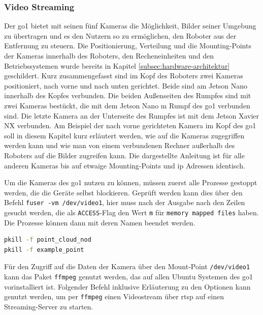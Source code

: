 \subsubsection{Video Streaming}
\label{subsubsec:video-streaming}

Der \gls{go1} bietet mit seinen fünf Kameras die Möglichkeit, Bilder seiner Umgebung zu übertragen und es den Nutzern so
zu ermöglichen, den Roboter aus der Entfernung zu steuern.
Die Positionierung, Verteilung und die Mounting-Points der Kameras innerhalb des Roboters, den Recheneinheiten und den
Betriebssystemen wurde bereits in Kapitel \ref{subsec:hardware-architektur} geschildert.
Kurz zusammengefasst sind im Kopf des Roboters zwei Kameras positioniert, nach vorne und nach unten gerichtet.
Beide sind am Jetson Nano innerhalb des Kopfes verbunden.
Die beiden Außenseiten des Rumpfes sind mit zwei Kameras bestückt, die mit dem Jetson Nano m Rumpf des \gls{go1} verbunden sind.
Die letzte Kamera an der Unterseite des Rumpfes ist mit dem Jetson Xavier NX verbunden.
Am Beispiel der nach vorne gerichteten Kamera im Kopf des \gls{go1} soll in diesem Kapitel kurz erläutert werden,
wie auf die Kameras zugegriffen werden kann und wie man von einem verbundenen Rechner außerhalb des Roboters auf die Bilder
zugreifen kann.
Die dargestellte Anleitung ist für alle anderen Kameras bis auf etwaige Mounting-Points und \gls{ip} Adressen identisch.


Um die Kameras des \gls{go1} nutzen zu können, müssen zuerst alle Prozesse gestoppt werden, die die Geräte selbst blockieren.
Geprüft werden kann dies über den Befehl \texttt{fuser -vm /dev/\allowbreak video1}, hier muss nach der Ausgabe nach den Zeilen gesucht werden,
die als \texttt{ACCESS}-Flag den Wert \texttt{m} für \texttt{memory mapped files} haben.
Die Prozesse können dann mit deren Namen beendet werden.

\begin{lstlisting}[language=Bash]
pkill -f point_cloud_nod
pkill -f example_point
\end{lstlisting}

\noindent Für den Zugriff auf die Daten der Kamera über den Mount-Point \texttt{/dev/\allowbreak video1} kann das Paket \texttt{ffmpeg}
genutzt werden, das auf allen Ubuntu Systemen des \gls{go1} vorinstalliert ist.
Folgender Befehl inklusive Erläuterung zu den Optionen kann genutzt werden, um per \texttt{ffmpeg} einen Videostream
über \gls{rtsp} auf einen Streaming-Server zu starten.

